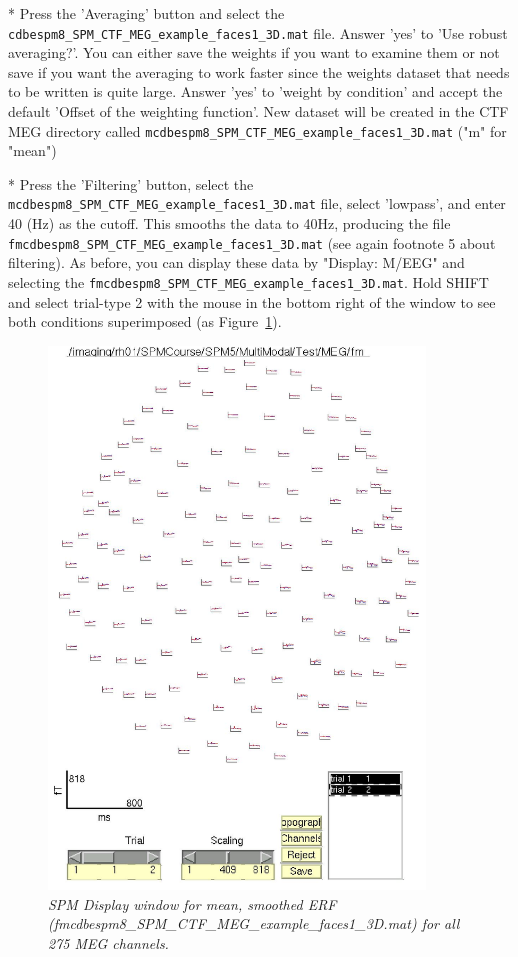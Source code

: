 * Press the 'Averaging' button and select the \verb!cdbespm8_SPM_CTF_MEG_example_faces1_3D.mat! file. Answer 'yes' to 'Use robust averaging?'. You can either save the weights if you want to examine them or not save if you want the averaging to work faster since the weights dataset that needs to be written is quite large. Answer 'yes' to 'weight by condition' and accept the default 'Offset of the weighting function'. New dataset will be created in the CTF MEG directory called \verb!mcdbespm8_SPM_CTF_MEG_example_faces1_3D.mat!    ("m" for "mean")

* Press the 'Filtering' button, select the \verb!mcdbespm8_SPM_CTF_MEG_example_faces1_3D.mat! file, select 'lowpass', and enter 40 (Hz) as the cutoff. This smooths the data to 40Hz, producing the file \verb!fmcdbespm8_SPM_CTF_MEG_example_faces1_3D.mat! (see again footnote 5 about filtering). As before, you can display these data by "Display: M/EEG" and selecting the \verb!fmcdbespm8_SPM_CTF_MEG_example_faces1_3D.mat!. Hold SHIFT and select trial-type 2 with the mouse in the bottom right of the window to see both conditions superimposed (as Figure~\ref{fig_32_10}).

\begin{figure}
\begin{center}
\includegraphics[width=100mm]{multimodal/figures/figure_32_10}
\caption{\em SPM Display window for mean, smoothed ERF (fmcdbespm8_SPM_CTF_MEG_example_faces1_3D.mat) for all 275 MEG channels. \label{fig_32_10}}
\end{center}
\end{figure}


